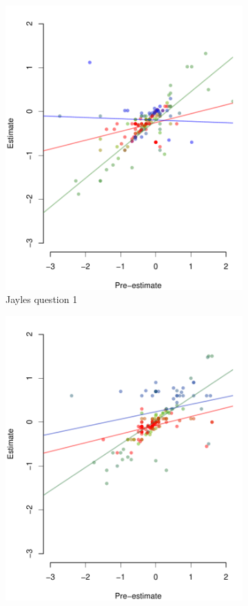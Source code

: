 \documentclass[10pt,a4paper,twocolumn,lineno]{article}
\begin{document}
\begin{figure}[htbp]
	\centering
	\begin{subfigure}[b]{.24\textwidth}
		\includegraphics[width=\textwidth]{../plots/jayles1_vs_xp.pdf}
		\caption{Jayles question 1}
	\end{subfigure}
	\begin{subfigure}[b]{.24\textwidth}
		\includegraphics[width=\textwidth]{../plots/jayles2_vs_xp.pdf}

\end{subfigure}
\end{figure}
\end{document}
